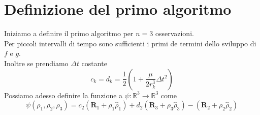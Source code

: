 \documentclass{beamer}
\def\R{\mathbb{R}}
\begin{document}
\section{Definizione del primo algoritmo}


\begin{frame}[plain]
Iniziamo a definire il primo algoritmo per $n=3$ osservazioni. \\
Per piccoli intervalli di tempo sono sufficienti i primi de termini dello sviluppo di $f$ e $g$. \\
Inoltre se prendiamo $\Delta t$ costante \begin{equation}
c_k=d_k=\frac{1}{2} \left(1+ \frac{\mu}{2r_k^3} \Delta t^2 \right)
\end{equation} 
Possiamo adesso definire la funzione a $\psi: \R^3 \longrightarrow \R^3$ come \begin{equation}
\psi(\rho_1, \rho_2, \rho_3)=c_2(\textbf{R}_1+ \rho_1 \hat{\rho}_1)+d_2(\textbf{R}_3+ \rho_3 \hat{\rho}_3)-(\textbf{R}_2+ \rho_2 \hat{\rho}_2)
\end{equation}
\end{frame}
\end{document}
